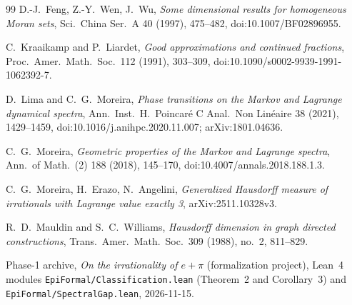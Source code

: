 \documentclass[11pt]{article}
\theoremstyle{definition}
\theoremstyle{remark}
\begin{document}
\begin{thebibliography}{99}
 D.-J.~Feng, Z.-Y.~Wen, J.~Wu, \emph{Some dimensional results
for homogeneous Moran sets}, Sci.\ China Ser.\ A 40 (1997), 475--482,
doi:10.1007/\allowbreak BF02896955.

 C.~Kraaikamp and P.~Liardet, \emph{Good approximations and
continued fractions}, Proc.\ Amer.\ Math.\ Soc.\ 112 (1991), 303--309, doi:10.1090/\allowbreak s0002-9939-1991-1062392-7.

 D.~Lima and C.~G.~Moreira, \emph{Phase transitions on
the Markov and Lagrange dynamical spectra}, Ann.\ Inst.\ H.~Poincar\'e
C Anal.\ Non Lin\'eaire 38 (2021), 1429--1459,
doi:10.1016/\allowbreak j.anihpc.2020.11.007; arXiv:1801.04636.

 C.~G.~Moreira, \emph{Geometric properties of the Markov and
Lagrange spectra}, Ann.\ of Math.\ (2) 188 (2018), 145--170,
doi:10.4007/\allowbreak annals.2018.188.1.3.

 C.~G.~Moreira, H.~Erazo, N.~Angelini,
\emph{Generalized Hausdorff measure of irrationals with Lagrange value exactly 3},
arXiv:2511.10328v3.

{\sloppy
{} R.~D.~Mauldin and S.~C.~Williams,
\emph{Hausdorff dimension in graph directed constructions},
Trans.~Amer.~Math.~Soc.~309 (1988), no.~2, 811--829.
}

 Phase-1 archive, \emph{On the irrationality of $e+\pi$}
(formalization project), Lean~4 modules \texttt{EpiFormal/\allowbreak Classification.lean}
(Theorem~2 and Corollary~3) and \texttt{EpiFormal/\allowbreak Spectral\allowbreak Gap.lean}, 2026-11-15.
\end{thebibliography}
\end{document}
